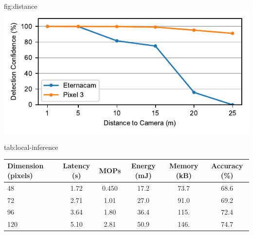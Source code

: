 \begin{definefigure}{fig:distance}
    \centering
    \includegraphics[width=\columnwidth]{figs/permacam/figs/distance_detection.pdf}
    \caption{}
\end{definefigure}

\begin{definetable}{tab:local-inference}
\begin{tabularx}{\columnwidth}{l c c c c c}
Dimension (pixels) & Latency (s) & MOPs & Energy (mJ) & Memory (kB) & Accuracy (\%) \\
\hline
48 & 1.72 & 0.450 & 17.2 & 73.7 & 68.6 \\
72 & 2.71 & 1.01 & 27.0 & 91.0 & 69.2 \\
96 & 3.64 & 1.80 & 36.4 & 115. & 72.4 \\
120 & 5.10 & 2.81 & 50.9 & 146. & 74.7 \\
\end{tabularx}
\caption {
    Latency, millions of operations, energy, peak memory, and accuracy 
    of local person classification. Images must be downscaled from full resolution, as inference on a 320x320 image requires too much runtime memory. The quantized version of model weights are used to measure accuracy of the validation set. The highest accuracy achieved is only 74.7\%, and requires 5.1 seconds of continuous computation.
}
\end{definetable}

